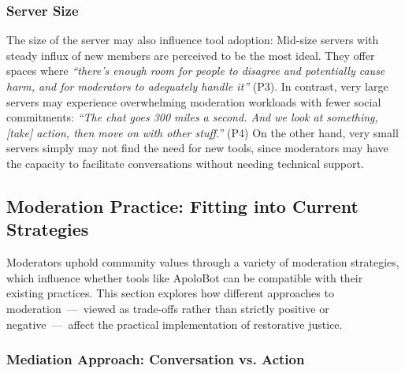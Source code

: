 \subsubsection{Server Size}
The size of the server may also influence tool adoption: Mid-size servers with steady influx of new members are perceived to be the most ideal. They offer spaces where \textit{“there's enough room for people to disagree and potentially cause harm, and for moderators to adequately handle it''} (P3). In contrast, very large servers may experience overwhelming moderation workloads with fewer social commitments: \textit{``The chat goes 300 miles a second. And we look at something, [take] action, then move on with other stuff.'' }(P4) On the other hand, very small servers simply may not find the need for new tools, since moderators may have the capacity to facilitate conversations without needing technical support.


\subsection{Moderation Practice: Fitting into Current Strategies}
Moderators uphold community values through a variety of moderation strategies, which influence whether tools like ApoloBot can be compatible with their existing practices. This section explores how different approaches to moderation~---~viewed as trade-offs rather than strictly positive or negative~---~affect the practical implementation of restorative justice.

\subsubsection{Mediation Approach: Conversation vs. Action}

